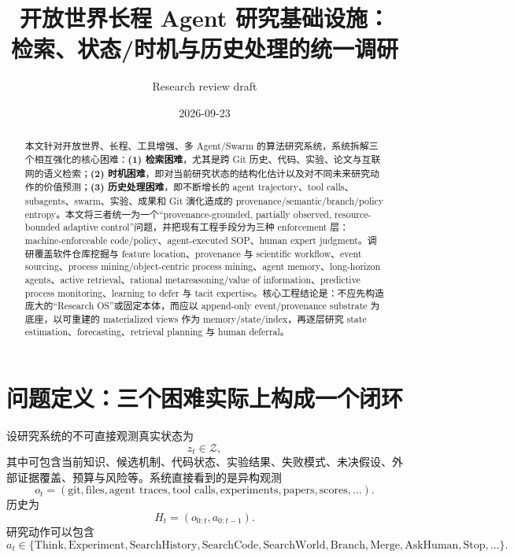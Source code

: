 \documentclass[11pt,a4paper]{ctexart}
\title{开放世界长程 Agent 研究基础设施：\\检索、状态/时机与历史处理的统一调研}
\author{Research review draft}
\date{2026-09-23}
\newcommand{\Z}{\mathcal{Z}}
\begin{document}
\maketitle

\begin{abstract}
本文针对开放世界、长程、工具增强、多 Agent/Swarm 的算法研究系统，系统拆解三个相互强化的核心困难：\textbf{(1) 检索困难}，尤其是跨 Git 历史、代码、实验、论文与互联网的语义检索；\textbf{(2) 时机困难}，即对当前研究状态的结构化估计以及对不同未来研究动作的价值预测；\textbf{(3) 历史处理困难}，即不断增长的 agent trajectory、tool calls、subagents、swarm、实验、成果和 Git 演化造成的 provenance/semantic/branch/policy entropy。本文将三者统一为一个“provenance-grounded, partially observed, resource-bounded adaptive control”问题，并把现有工程手段分为三种 enforcement 层：machine-enforceable code/policy、agent-executed SOP、human expert judgment。调研覆盖软件仓库挖掘与 feature location、provenance 与 scientific workflow、event sourcing、process mining/object-centric process mining、agent memory、long-horizon agents、active retrieval、rational metareasoning/value of information、predictive process monitoring、learning to defer 与 tacit expertise。核心工程结论是：不应先构造庞大的“Research OS”或固定本体，而应以 append-only event/provenance substrate 为底座，以可重建的 materialized views 作为 memory/state/index，再逐层研究 state estimation、forecasting、retrieval planning 与 human deferral。
\end{abstract}

\tableofcontents

\section{问题定义：三个困难实际上构成一个闭环}

设研究系统的不可直接观测真实状态为
\begin{equation}
 z_t\in\Z,
\end{equation}
其中可包含当前知识、候选机制、代码状态、实验结果、失败模式、未决假设、外部证据覆盖、预算与风险等。系统直接看到的是异构观测
\begin{equation}
 o_t=(\text{git},\text{files},\text{agent traces},\text{tool calls},\text{experiments},\text{papers},\text{scores},\ldots).
\end{equation}
历史为
\begin{equation}
 H_t=(o_{0:t},a_{0:t-1}).
\end{equation}
研究动作可以包含
\begin{equation}
 a_t\in\{\text{Think},\text{Experiment},\text{SearchHistory},\text{SearchCode},\text{SearchWorld},\text{Branch},\text{Merge},\text{AskHuman},\text{Stop},\ldots\}.
\end{equation}
\end{document}
